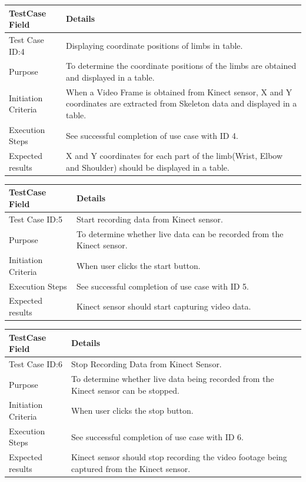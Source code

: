 \documentclass[a4paper, 12pt]{article}
\begin{document}
 
\begin{table}[!htb]
 \begin{tabular}{|p{4cm}|p{10cm}|}
 \hline
  TestCase Field & Details \\
  \hline
   Test Case ID:4 & Displaying coordinate positions of limbs in table.  \\
  \hline 
   Purpose & To determine the coordinate positions of the limbs are obtained and displayed in a table.  \\
  \hline
   Initiation Criteria & When a Video Frame is obtained from Kinect sensor, X and Y coordinates are extracted from Skeleton data and displayed in a table. \\
  \hline
   Execution Steps & See successful completion of use case with ID 4.  \\
  \hline
   Expected results & X and Y coordinates for each part of the limb(Wrist, Elbow and Shoulder) should be displayed in a table.  \\
  \hline
 \end{tabular}
\end{table}

\begin{table}[!htb]
 \begin{tabular}{|p{4cm}|p{10cm}|}
 \hline
  TestCase Field & Details \\
  \hline
   Test Case ID:5 & Start recording data from Kinect sensor. \\
  \hline 
   Purpose & To determine whether live data can be recorded from the Kinect sensor. \\
  \hline
   Initiation Criteria & When user clicks the start button.  \\
  \hline
   Execution Steps & See successful completion of use case with ID 5.  \\
  \hline
   Expected results & Kinect sensor should start capturing video data. \\
  \hline
 \end{tabular}
\end{table}


\begin{table}[!htb]
 \begin{tabular}{|p{4cm}|p{10cm}|}
 \hline
  TestCase Field & Details \\
  \hline
   Test Case ID:6 & Stop Recording Data from Kinect Sensor. \\
  \hline 
   Purpose & To determine whether live data being recorded from the Kinect sensor can be stopped. \\
  \hline
   Initiation Criteria & When user clicks the stop button.  \\
  \hline
   Execution Steps & See successful completion of use case with ID 6.  \\
  \hline
   Expected results & Kinect sensor should stop recording the video footage being captured from the Kinect sensor. \\
  \hline
 \end{tabular}
\end{table}
\end{document}
